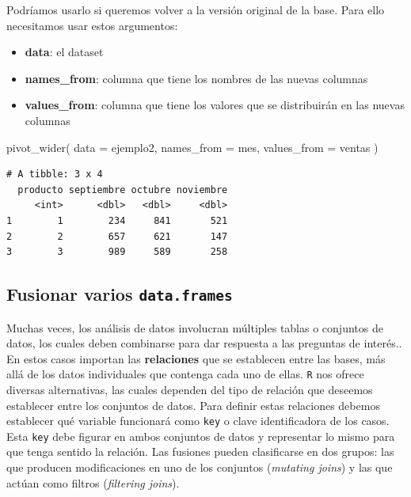\documentclass[
]{book}
\newenvironment{Shaded}{\begin{snugshade}}{\end{snugshade}}
\newcommand{\AttributeTok}[1]{\textcolor[rgb]{0.77,0.63,0.00}{#1}}
\newcommand{\FunctionTok}[1]{\textcolor[rgb]{0.00,0.00,0.00}{#1}}
\newcommand{\NormalTok}[1]{#1}
\providecommand{\tightlist}{%
  \setlength{\itemsep}{0pt}\setlength{\parskip}{0pt}}
\begin{document}
Podríamos usarlo si queremos volver a la versión original de la base. Para ello necesitamos usar estos argumentos:

\begin{itemize}
\tightlist
\item
  \textbf{data}: el dataset
\item
  \textbf{names\_from}: columna que tiene los nombres de las nuevas columnas
\item
  \textbf{values\_from}: columna que tiene los valores que se distribuirán en las nuevas columnas
\end{itemize}

\begin{Shaded}
\begin{Highlighting}[]
\FunctionTok{pivot\_wider}\NormalTok{(}
  \AttributeTok{data =}\NormalTok{ ejemplo2, }
  \AttributeTok{names\_from =}\NormalTok{ mes, }
  \AttributeTok{values\_from =}\NormalTok{ ventas}
\NormalTok{)}
\end{Highlighting}
\end{Shaded}

\begin{verbatim}
# A tibble: 3 x 4
  producto septiembre octubre noviembre
     <int>      <dbl>   <dbl>     <dbl>
1        1        234     841       521
2        2        657     621       147
3        3        989     589       258
\end{verbatim}

\hypertarget{fusionar-varios-data.frames}{%
\subsection{\texorpdfstring{Fusionar varios \texttt{data.frames}}{Fusionar varios data.frames}}\label{fusionar-varios-data.frames}}

Muchas veces, los análisis de datos involucran múltiples tablas o conjuntos de datos, los cuales deben combinarse para dar respuesta a las preguntas de interés.. En estos casos importan las \textbf{relaciones} que se establecen entre las bases, más allá de los datos individuales que contenga cada uno de ellas. \texttt{R} nos ofrece diversas alternativas, las cuales dependen del tipo de relación que deseemos establecer entre los conjuntos de datos. Para definir estas relaciones debemos establecer qué variable funcionará como \texttt{key} o clave identificadora de los casos. Esta \texttt{key} debe figurar en ambos conjuntos de datos y representar lo mismo para que tenga sentido la relación. Las fusiones pueden clasificarse en dos grupos: las que producen modificaciones en uno de los conjuntos (\emph{mutating joins}) y las que actúan como filtros (\emph{filtering joins}).
\end{document}
